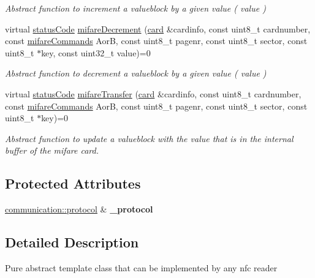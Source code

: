 \begin{DoxyCompactItemize}
\begin{DoxyCompactList}\small\item\em Abstract function to increment a valueblock by a given value ( value ) \end{DoxyCompactList}\item 
virtual \hyperlink{declarations_8h_ae1d20c5a38cae82ccaa6a77be3fd264b}{status\+Code} \hyperlink{classnfc_1_1NFC_a81f93853766cc9df5f061b95b6a41700}{mifare\+Decrement} (\hyperlink{classcard}{card} \&cardinfo, const uint8\+\_\+t cardnumber, const \hyperlink{declarations_8h_a305b1a3bcfca65e2a82f0f9d24676835}{mifare\+Commands} AorB, const uint8\+\_\+t pagenr, const uint8\+\_\+t sector, const uint8\+\_\+t $\ast$key, const uint32\+\_\+t value)=0
\begin{DoxyCompactList}\small\item\em Abstract function to decrement a valueblock by a given value ( value ) \end{DoxyCompactList}\item 
virtual \hyperlink{declarations_8h_ae1d20c5a38cae82ccaa6a77be3fd264b}{status\+Code} \hyperlink{classnfc_1_1NFC_adbbca8ec51da75e498c7a9f10346ee07}{mifare\+Transfer} (\hyperlink{classcard}{card} \&cardinfo, const uint8\+\_\+t cardnumber, const \hyperlink{declarations_8h_a305b1a3bcfca65e2a82f0f9d24676835}{mifare\+Commands} AorB, const uint8\+\_\+t pagenr, const uint8\+\_\+t sector, const uint8\+\_\+t $\ast$key)=0
\begin{DoxyCompactList}\small\item\em Abstract function to update a valueblock with the value that is in the internal buffer of the mifare card. \end{DoxyCompactList}\end{DoxyCompactItemize}
\subsection*{Protected Attributes}
\begin{DoxyCompactItemize}
\item 
\mbox{\label{classnfc_1_1NFC_ac6089dd87172f3ce870767500e53b9e8}} 
\hyperlink{classcommunication_1_1protocol}{communication\+::protocol} \& {\bfseries \+\_\+protocol}
\end{DoxyCompactItemize}


\subsection{Detailed Description}
Pure abstract template class that can be implemented by any nfc reader 

